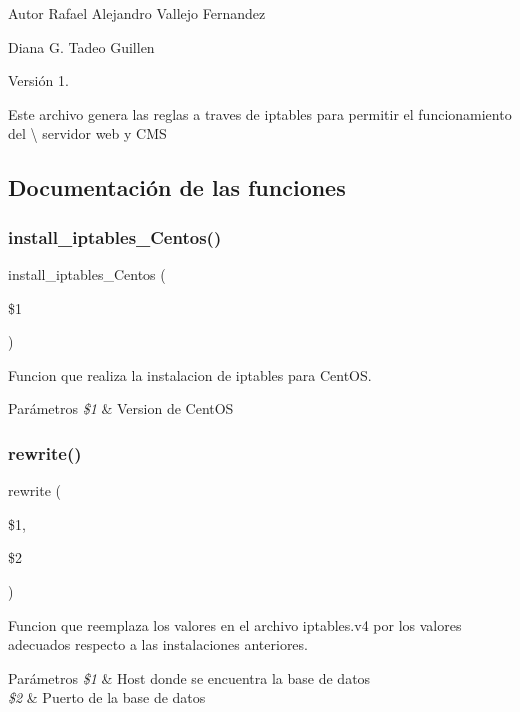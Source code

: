 \begin{DoxyAuthor}{Autor}
Rafael Alejandro Vallejo Fernandez 

Diana G. Tadeo Guillen 
\end{DoxyAuthor}
\begin{DoxyVersion}{Versión}
1.
\end{DoxyVersion}
Este archivo genera las reglas a traves de \textquotesingle{}iptables\textquotesingle{} para permitir el funcionamiento del \textbackslash{} servidor web y C\+MS 

\subsection{Documentación de las funciones}
\mbox{\label{Firewall__Config_8sh_a5d5731dd15ca51ce0c45d4e70900a0e1}} 
\subsubsection{\texorpdfstring{install\+\_\+iptables\+\_\+\+Centos()}{install\_iptables\_Centos()}}
{\footnotesize\ttfamily install\+\_\+iptables\+\_\+\+Centos (\begin{DoxyParamCaption}\item[{}]{\$1 }\end{DoxyParamCaption})}



Funcion que realiza la instalacion de iptables para Cent\+OS. 


\begin{DoxyParams}{Parámetros}
{\em \$1} & Version de Cent\+OS \\
\hline
\end{DoxyParams}
\mbox{\label{Firewall__Config_8sh_a974e380b6c72b01875d622d64e70372f}} 
\subsubsection{\texorpdfstring{rewrite()}{rewrite()}}
{\footnotesize\ttfamily rewrite (\begin{DoxyParamCaption}\item[{}]{\$1,  }\item[{}]{\$2 }\end{DoxyParamCaption})}



Funcion que reemplaza los valores en el archivo iptables.\+v4 por los valores adecuados respecto a las instalaciones anteriores. 


\begin{DoxyParams}{Parámetros}
{\em \$1} & Host donde se encuentra la base de datos \\
\hline
{\em \$2} & Puerto de la base de datos \\
\hline
\end{DoxyParams}
